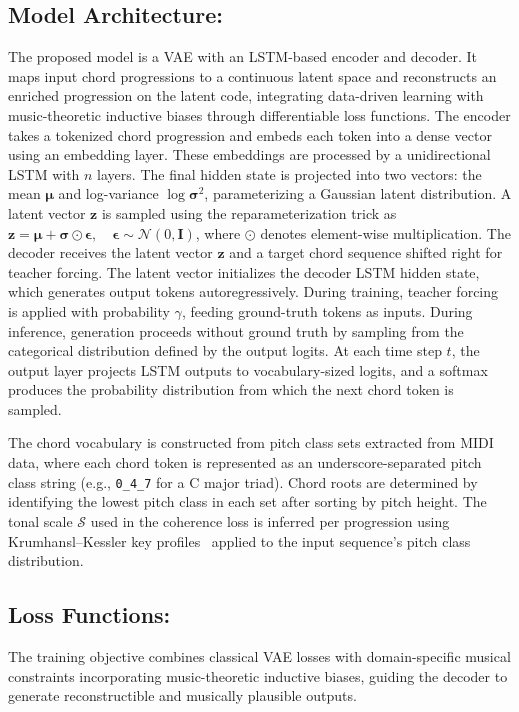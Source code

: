 \documentclass[conference]{IEEEtran}
\begin{document}
\subsection{\textbf{Model Architecture:}}
The proposed model is a VAE with an LSTM-based encoder and decoder. It maps input chord progressions to a continuous latent space and reconstructs an enriched progression on the latent code, integrating data-driven learning with music-theoretic inductive biases through differentiable loss functions.
The encoder takes a tokenized chord progression and embeds each token into a dense vector using an embedding layer. These embeddings are processed by a unidirectional LSTM with $n$ layers. The final hidden state is projected into two vectors: the mean $\boldsymbol{\mu}$ and log-variance $\log \boldsymbol{\sigma}^2$, parameterizing a Gaussian latent distribution. A latent vector $\mathbf{z}$ is sampled using the reparameterization trick as
$\mathbf{z} = \boldsymbol{\mu} + \boldsymbol{\sigma} \odot \boldsymbol{\epsilon}, \quad
\boldsymbol{\epsilon} \sim \mathcal{N}(0, \mathbf{I})$,
where $\odot$ denotes element-wise multiplication. The decoder receives the latent vector $\mathbf{z}$ and a target chord sequence shifted right for teacher forcing. The latent vector initializes the decoder LSTM hidden state, which generates output tokens autoregressively. During training, teacher forcing is applied with probability $\gamma$, feeding ground-truth tokens as inputs. During inference, generation proceeds without ground truth by sampling from the categorical distribution defined by the output logits. At each time step $t$, the output layer projects LSTM outputs to vocabulary-sized logits, and a softmax produces the probability distribution from which the next chord token is sampled.

The chord vocabulary is constructed from pitch class sets extracted from MIDI data, where each chord token is represented as an underscore-separated pitch class string (e.g., \texttt{0\_4\_7} for a C major triad). Chord roots are determined by identifying the lowest pitch class in each set after sorting by pitch height. The tonal scale $\mathcal{S}$ used in the coherence loss is inferred per progression using Krumhansl--Kessler key profiles~\cite{krumhansl1990cognitive} applied to the input sequence's pitch class distribution.
\subsection{\textbf{Loss Functions:}}
\label{sec:loss}
The training objective combines classical VAE losses with domain-specific musical constraints incorporating music-theoretic inductive biases, guiding the decoder to generate reconstructible and musically plausible outputs.
\end{document}
